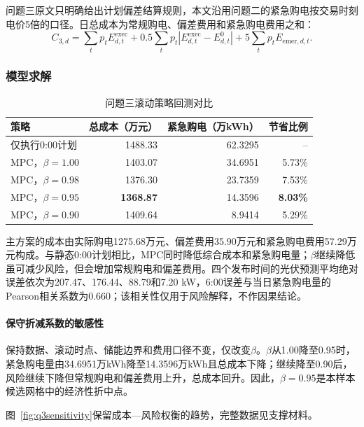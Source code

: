 \documentclass{cumcmthesis}
\begin{document}
问题三原文只明确给出计划偏差结算规则，本文沿用问题二的紧急购电按交易时刻电价5倍的口径。日总成本为常规购电、偏差费用和紧急购电费用之和：
\begin{equation}
C_{3,d}=\sum_t p_tE^{\mathrm{exec}}_{d,t}
+0.5\sum_t p_t|E^{\mathrm{exec}}_{d,t}-E^0_{d,t}|
+5\sum_t p_tE_{\mathrm{emer},d,t}.
\tag{23}
\end{equation}

\subsubsection{模型求解}

\begin{table}[H]
\centering
\renewcommand\arraystretch{1.2}
\caption{问题三滚动策略回测对比}
\label{tab:q3result}
\begin{tabular}{lrrr}
\toprule
\textbf{策略} & 总成本（万元） & 紧急购电（万kWh） & 节省比例\\
\midrule
仅执行0:00计划 & 1488.33 & 62.3295 & --\\
MPC，$\beta=1.00$ & 1403.07 & 34.6951 & 5.73\%\\
MPC，$\beta=0.98$ & 1376.30 & 23.7359 & 7.53\%\\
MPC，$\beta=0.95$ & \textbf{1368.87} & 14.3596 & \textbf{8.03\%}\\
MPC，$\beta=0.90$ & 1409.64 & 8.9414 & 5.29\%\\
\bottomrule
\end{tabular}
\end{table}

主方案的成本由实际购电1275.68万元、偏差费用35.90万元和紧急购电费用57.29万元构成。与静态0:00计划相比，MPC同时降低综合成本和紧急购电量；$\beta$继续降低虽可减少风险，但会增加常规购电和偏差费用。四个发布时间的光伏预测平均绝对误差依次为207.47、176.44、88.79和7.20 kW，6:00误差与当日紧急购电量的Pearson相关系数为0.660；该相关性仅用于风险解释，不作因果结论。

\paragraph{保守折减系数的敏感性}

保持数据、滚动时点、储能边界和费用口径不变，仅改变$\beta$。$\beta$从1.00降至0.95时，紧急购电量由34.6951万kWh降至14.3596万kWh且总成本下降；继续降至0.90后，风险继续下降但常规购电和偏差费用上升，总成本回升。因此，$\beta=0.95$是本样本候选网格中的经济性折中点。

图~\ref{fig:q3sensitivity}保留成本—风险权衡的趋势，完整数据见支撑材料。
\end{document}
